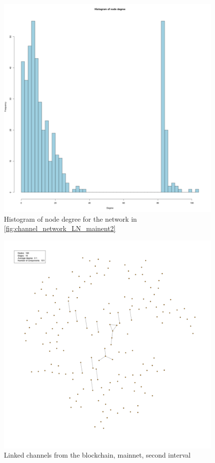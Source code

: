 \begin{figure}[H]
    \centering
    \includegraphics[width=16cm]{figures/graphs/histogram_ln_mainnet_run2.png}
    \caption{Histogram of node degree for the network in \cref{fig:channel_network_LN_mainent2}}
    \label{fig:histogram}
\end{figure}

\begin{figure}[H]
    \centering
    \includegraphics[width=14cm]{figures/graphs/cg_bc_mainnet_run2.png}
    \caption{Linked channels from the blockchain, mainnet, second interval}
    \label{fig:channel_network_BC_mainnet}
\end{figure}


